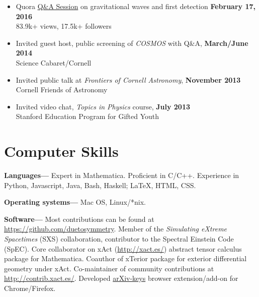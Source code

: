 \documentclass[margin,line]{res}
\begin{document}
\begin{resume}
\begin{itemize}
\item[] Quora \href{https://www.quora.com/session/Leo-C-Stein/1}{Q\&A Session} on gravitational waves and first detection
  \hfill {\bf February 17, 2016} \\
\hspace*{1em} 83.9k+ views, 17.5k+ followers \\

\item[] Invited guest host, public screening of {\it COSMOS} with Q\&A,
  \hfill {\bf March/June 2014} \\
\hspace*{1em} Science Cabaret/Cornell
\item[] Invited public talk at {\it Frontiers of Cornell Astronomy}, \hfill {\bf November 2013} \\
\hspace*{1em} Cornell Friends of Astronomy
\item[] Invited video chat, {\it Topics in Physics} course, \hfill {\bf July 2013} \\
\hspace*{1em} Stanford Education Program for Gifted Youth
\end{itemize}

\section{\sc Computer Skills}
{\bf Languages---}%
Expert in {\sc Mathematica}. Proficient in C/C++. Experience in
Python, Javascript, Java, Bash, Haskell; LaTeX, HTML, CSS.

{\bf Operating systems---}%
Mac OS, Linux/*nix.

{\bf Software---}%
Most contributions can be found at \url{https://github.com/duetosymmetry}.
Member of the {\it Simulating eXtreme Spacetimes} (SXS) collaboration,
contributor to the Spectral Einstein Code (SpEC).
Core collaborator on {\sc xAct} (\url{http://xact.es/}) abstract
tensor calculus package for {\sc  Mathematica}. Coauthor
of {\sc xTerior} package for exterior differential geometry under
{\sc xAct}. Co-maintainer of community contributions at
\url{http://contrib.xact.es/}. Developed
\href{https://chrome.google.com/webstore/detail/arxiv-keys/fkjjdlbhliopfhgddlpoggpmpgjfaojd}{arXiv-keys}
browser extension/add-on for Chrome/Firefox.


\ifx\nopubs\undefined

\else
%
\fi




\end{resume}
\end{document}
